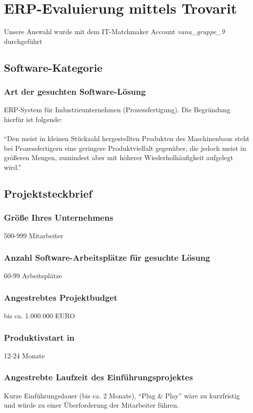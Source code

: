 \section{ERP-Evaluierung mittels Trovarit}
Unsere Auswahl wurde mit dem IT-Matchmaker Account \textit{vana\_gruppe\_9} durchgeführt


\subsection{Software-Kategorie}
\subsubsection{Art der gesuchten Software-Lösung}
\label{sssec_art}
ERP-System für Industrieunternehmen (Prozessfertigung). Die Begründung hierfür ist folgende:\\\\
\enquote{Den meist in kleinen Stückzahl hergestellten Produkten des Maschinenbaus steht bei Prozessfertigern eine geringere Produktvielfalt gegenüber, die jedoch meist in größeren Mengen, zumindest aber mit höherer Wiederholhäufigkeit aufgelegt wird.} \cite{trovarit_prozessfertigung}

\subsection{Projektsteckbrief}
\subsubsection{Größe Ihres Unternehmens}
500-999 Mitarbeiter
\subsubsection{Anzahl Software-Arbeitsplätze für gesuchte Lösung}
60-99 Arbeitsplätze
\subsubsection{Angestrebtes Projektbudget}
bis ca. 1.000.000 EURO
\subsubsection{Produktivstart in}
12-24 Monate
\subsubsection{Angestrebte Laufzeit des Einführungsprojektes}
Kurze Einführungsdauer (bis ca. 2 Monate), \enquote{Plug \& Play} wäre zu kurzfristig und würde zu einer Überforderung der Mitarbeiter führen.
